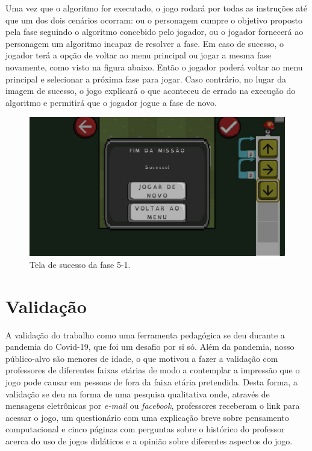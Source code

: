 \documentclass[conference]{IEEEtran}
\begin{document}
Uma vez que o algoritmo for executado, o jogo rodará por todas as instruções até que um dos dois cenários ocorram: ou o personagem cumpre o objetivo proposto pela fase seguindo o algoritmo concebido pelo jogador, ou o jogador fornecerá ao personagem um algoritmo incapaz de resolver a fase. Em caso de sucesso, o jogador terá a opção de voltar ao menu principal ou jogar a mesma fase novamente, como visto na figura abaixo. Então o jogador poderá voltar ao menu principal e selecionar a próxima fase para jogar. Caso contrário, no lugar da imagem de sucesso, o jogo explicará o que aconteceu de errado na execução do algoritmo e permitirá que o jogador jogue a fase de novo.
\begin{figure}[htbp]
\centerline{\includegraphics[scale=0.275]{images/fig03.jpg}}
\caption{Tela de sucesso da fase 5-1.}
\label{fig}
\end{figure}

\section{Validação}

A validação do trabalho como uma ferramenta pedagógica se deu durante a pandemia do Covid-19, que foi um desafio por si só. Além da pandemia, nosso público-alvo são menores de idade, o que motivou a fazer a validação com professores de diferentes faixas etárias de modo a contemplar a impressão que o jogo pode causar em pessoas de fora da faixa etária pretendida. Desta forma, a validação se deu na forma de uma pesquisa qualitativa onde, através de mensagens eletrônicas por \textit{e-mail} ou \textit{facebook}, professores receberam o link para acessar o jogo, um questionário com uma explicação breve sobre pensamento computacional e cinco páginas com perguntas sobre o histórico do professor acerca do uso de jogos didáticos e a opinião sobre diferentes aspectos do jogo. 
\end{document}
